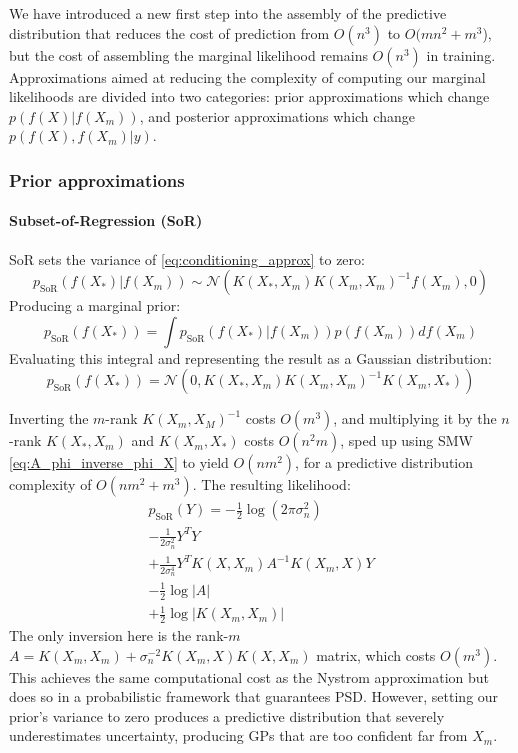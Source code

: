 We have introduced a new first step into the assembly of the predictive distribution that reduces the cost of prediction from $O(n^3)$ to $O(mn^2 + m^3$), but the cost of assembling the marginal likelihood remains $O(n^3)$ in training. Approximations aimed at reducing the complexity of computing our marginal likelihoods are divided into two categories: prior approximations which change $p(f(X) | f(X_m))$, and posterior approximations which change $p(f(X), f(X_m) | y)$.

\subsubsection{Prior approximations}

\paragraph{Subset-of-Regression (SoR) \cite{sor}}
SoR sets the variance of \ref{eq:conditioning_approx} to zero:
\begin{equation*}
    p_{\text{SoR}}(f(X_*) | f(X_m)) \sim \mathcal{N} (
    K(X_*, X_m) K(X_m, X_m)^{-1} f(X_m),
    0
    )
\end{equation*}
Producing a marginal prior:
\begin{equation*}
    p_{\text{SoR}}(f(X_*)) = \int p_{\text{SoR}}(f(X_*) | f(X_m)) p(f(X_m)) df(X_m)
\end{equation*}
Evaluating this integral and representing the result as a Gaussian distribution:
\begin{equation*}
    p_{\text{SoR}}(f(X_*)) = \mathcal{N}(
    0, 
    K(X_*, X_m) K(X_m, X_m)^{-1} K(X_m, X_*)
    )
\end{equation*}

Inverting the $m$-rank $K(X_m, X_M)^{-1}$ costs $O(m^3)$, and multiplying it by the $n$-rank $K(X_*, X_m)$ and $K(X_m, X_*)$ costs $O(n^2m)$, sped up using SMW \ref{eq:A_phi_inverse_phi_X} to yield $O(nm^2)$, for a predictive distribution complexity of $O(nm^2 + m^3)$. The resulting likelihood:
\begin{equation*}
    \begin{aligned}
        p_{\text{SoR}}(Y) = -\frac{1}{2} \log(2 \pi \sigma_n^2) \\
        - \frac{1}{2\sigma_n^2} Y ^T Y \\
        + \frac{1}{2\sigma_n^4} Y^T K(X, X_m) A^{-1} K(X_m, X) Y \\ 
        - \frac{1}{2} \log | A | \\
        + \frac{1}{2} \log | K(X_m, X_m) |
    \end{aligned}
\end{equation*}
The only inversion here is the rank-$m$ $A = K(X_m, X_m) + \sigma_n^{-2} K(X_m, X) K(X, X_m)$ matrix, which costs $O(m^3)$. This achieves the same computational cost as the Nystrom approximation but does so in a probabilistic framework that guarantees PSD. However, setting our prior's variance to zero produces a predictive distribution that severely underestimates uncertainty, producing GPs that are too confident far from $X_m$.

